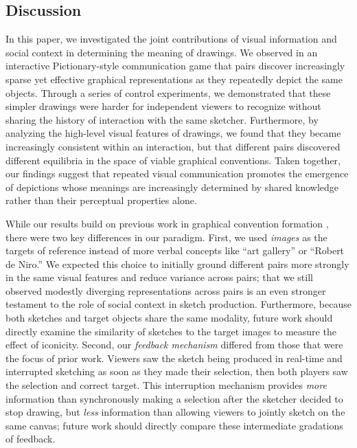 \documentclass[10pt,letterpaper]{article}
\newcommand{\red}[1]{\textcolor{Red}{#1}}
\begin{document}


\subsection{Discussion}

In this paper, we investigated the joint contributions of visual information and social context in determining the meaning of drawings.
We observed in an interactive Pictionary-style communication game that pairs discover increasingly sparse yet effective graphical representations as they repeatedly depict the same objects.
Through a series of control experiments, we demonstrated that these simpler drawings were harder for independent viewers to recognize without sharing the history of interaction with the same sketcher.
Furthermore, by analyzing the high-level visual features of drawings, we found that they became increasingly consistent within an interaction, but that different pairs discovered different equilibria in the space of viable graphical conventions. 
Taken together, our findings suggest that repeated visual communication promotes the emergence of depictions whose meanings are increasingly determined by shared knowledge rather than their perceptual properties alone.

While our results build on previous work in graphical convention formation \cite{garrod_foundations_2007,fay2010interactive}, there were two key differences in our paradigm. 
First, we used \emph{images} as the targets of reference instead of more verbal concepts like ``art gallery'' or ``Robert de Niro.''  
We expected this choice to initially ground different pairs more strongly in the same visual features and reduce variance across pairs; that we still observed modestly diverging representations across pairs is an even stronger testament  to the role of social context in sketch production.
Furthermore, because both sketches and target objects share the same modality, future work should directly examine the similarity of sketches to the target images to measure the effect of iconicity.
Second, our \emph{feedback mechanism} differed from those that were the focus of prior work.
Viewers saw the sketch being produced in real-time and interrupted sketching as soon as they made their selection, then both players saw the selection and correct target.
This interruption mechanism provides \emph{more} information than synchronously making a selection after the sketcher decided to stop drawing, but \emph{less} information than allowing viewers to jointly sketch on the same canvas; future work should directly compare these intermediate gradations of feedback.
\end{document}
